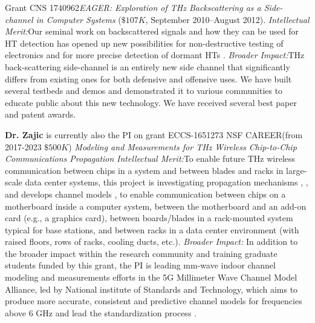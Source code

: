 \documentclass[11 pt]{article}
\begin{document}
Grant CNS 1740962\textit{EAGER: Exploration of THz Backscattering
as a Side-channel in Computer Systems}
($\$107K$, September 2010--August 2012).
\textit{Intellectual Merit:}Our seminal work on backscattered signals and how they can be used for HT detection has opened up new possibilities
for non-destructive testing of electronics and for more precise detection of dormant HTs \cite{Pavel2020,nguyen19,Erik2022}.
\textit{Broader Impact:}THz back-scattering side-channel is an entirely new side channel that significantly differs
from existing ones for both defensive and offensive uses. We have built several testbeds and demos and demonstrated it to various communities
to educate public about this new technology. We have received several best paper and patent awards.

{\bf Dr. Zajic} is currently also the PI on grant ECCS-1651273 NSF CAREER(from 2017-2023 $\$500K$) \textit{Modeling and Measurements for THz Wireless Chip-to-Chip Communications Propagation} \textit{Intellectual Merit:}To enable future THz wireless communication between chips in a system and between blades and racks in large-scale data center systems, this project is investigating  propagation mechanisms \cite{Cheng2020}, \cite{Kim2016}, \cite{Fu2019} and develops channel models \cite{Kim2016a}, \cite{Fu2020} to enable communication between chips on a motherboard inside a computer system, between the motherboard and an add-on card (e.g., a graphics card), between boards/blades in a rack-mounted system typical for base stations, and between racks in a data center environment (with raised floors, rows of racks, cooling ducts, etc.). \textit{Broader Impact:} In addition to the broader impact within the research community and training graduate students funded by this grant, the PI is leading mm-wave indoor channel modeling and measurements efforts in the 5G Millimeter Wave Channel Model Alliance, led by National institute of Standards and Technology, which aims to produce more accurate, consistent and predictive channel models for frequencies above 6 GHz and lead the standardization process \cite{Book}.





\end{document}
